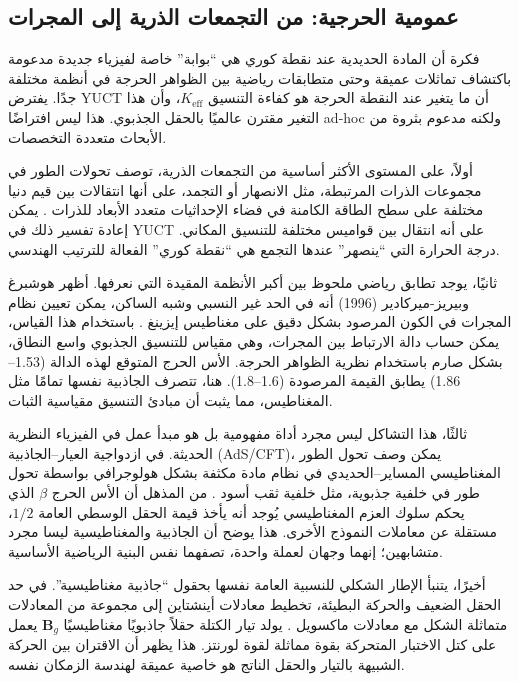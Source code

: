 \documentclass[11pt,a4paper]{article}
\begin{document}
	\subsection{عمومية الحرجية: من التجمعات الذرية إلى المجرات}
	\label{subsec:universality}
	
	فكرة أن المادة الحديدية عند نقطة كوري هي ``بوابة'' خاصة لفيزياء جديدة مدعومة باكتشاف تماثلات عميقة وحتى متطابقات رياضية بين الظواهر الحرجة في أنظمة مختلفة جدًا. يفترض YUCT أن ما يتغير عند النقطة الحرجة هو كفاءة التنسيق $K_{\mathrm{eff}}$، وأن هذا التغير مقترن عالميًا بالحقل الجذبوي. هذا ليس افتراضًا ad-hoc ولكنه مدعوم بثروة من الأبحاث متعددة التخصصات.
	
	أولاً، على المستوى الأكثر أساسية من التجمعات الذرية، توصف تحولات الطور في مجموعات الذرات المرتبطة، مثل الانصهار أو التجمد، على أنها انتقالات بين قيم دنيا مختلفة على سطح الطاقة الكامنة في فضاء الإحداثيات متعدد الأبعاد للذرات \cite{Berry2005}. يمكن إعادة تفسير ذلك في YUCT على أنه انتقال بين قواميس مختلفة للتنسيق المكاني. درجة الحرارة التي ``ينصهر'' عندها التجمع هي ``نقطة كوري'' الفعالة للترتيب الهندسي.
	
	ثانيًا، يوجد تطابق رياضي ملحوظ بين أكبر الأنظمة المقيدة التي نعرفها. أظهر هوشبرغ وبيريز-ميركادير (1996) أنه في الحد غير النسبي وشبه الساكن، يمكن تعيين نظام المجرات في الكون المرصود بشكل دقيق على مغناطيس إيزينغ \cite{Hochberg1996}. باستخدام هذا القياس، يمكن حساب دالة الارتباط بين المجرات، وهي مقياس للتنسيق الجذبوي واسع النطاق، بشكل صارم باستخدام نظرية الظواهر الحرجة. الأس الحرج المتوقع لهذه الدالة (1.53–1.86) يطابق القيمة المرصودة (1.6–1.8). هنا، تتصرف الجاذبية نفسها تمامًا مثل المغناطيس، مما يثبت أن مبادئ التنسيق مقياسية الثبات.
	
	ثالثًا، هذا التشاكل ليس مجرد أداة مفهومية بل هو مبدأ عمل في الفيزياء النظرية الحديثة. في ازدواجية العيار–الجاذبية (AdS/CFT)، يمكن وصف تحول الطور المغناطيسي المساير–الحديدي في نظام مادة مكثفة بشكل هولوجرافي بواسطة تحول طور في خلفية جذبوية، مثل خلفية ثقب أسود \cite{Ghotbabadi2021, Zbl2021}. من المذهل أن الأس الحرج $\beta$ الذي يحكم سلوك العزم المغناطيسي يُوجد أنه يأخذ قيمة الحقل الوسطي العامة $1/2$، مستقلة عن معاملات النموذج الأخرى. هذا يوضح أن الجاذبية والمغناطيسية ليسا مجرد متشابهين؛ إنهما وجهان لعملة واحدة، تصفهما نفس البنية الرياضية الأساسية.
	
	أخيرًا، يتنبأ الإطار الشكلي للنسبية العامة نفسها بحقول ``جاذبية مغناطيسية''. في حد الحقل الضعيف والحركة البطيئة، تخطيط معادلات أينشتاين إلى مجموعة من المعادلات متماثلة الشكل مع معادلات ماكسويل \cite{ciufolini1995}. يولد تيار الكتلة حقلاً جاذبويًا مغناطيسيًا $ \mathbf{B}_g$ يعمل على كتل الاختبار المتحركة بقوة مماثلة لقوة لورنتز. هذا يظهر أن الاقتران بين الحركة الشبيهة بالتيار والحقل الناتج هو خاصية عميقة لهندسة الزمكان نفسه.
	
\end{document}
